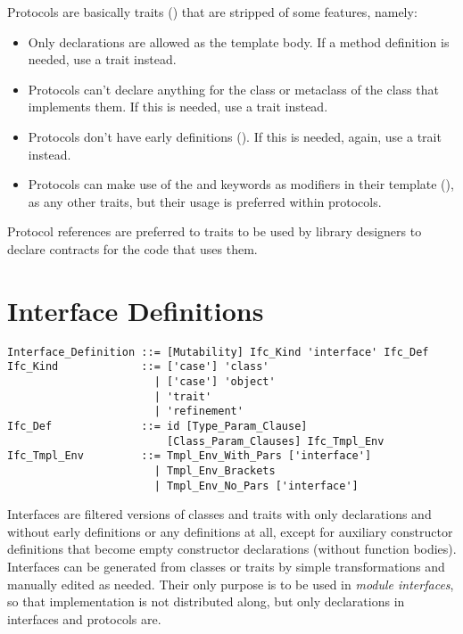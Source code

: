 Protocols are basically traits () that are stripped of some features, namely: 
\begin{itemize}
  \item Only declarations are allowed as the template body. If a method definition is needed, use a trait instead. 

  \item Protocols can't declare anything for the class or metaclass of the class that implements them. If this is needed, use a trait instead. 

  \item Protocols don't have early definitions (). If this is needed, again, use a trait instead. 

  \item Protocols can make use of the  and  keywords as modifiers in their template (), as any other traits, but their usage is preferred within protocols. 
\end{itemize}

Protocol references are preferred to traits to be used by library designers to declare contracts for the code that uses them. 





\section{Interface Definitions}
\label{sec:interfaces}

\syntax\begin{lstlisting}
Interface_Definition ::= [Mutability] Ifc_Kind 'interface' Ifc_Def
Ifc_Kind             ::= ['case'] 'class' 
                       | ['case'] 'object'
                       | 'trait'
                       | 'refinement'
Ifc_Def              ::= id [Type_Param_Clause]
                         [Class_Param_Clauses] Ifc_Tmpl_Env
Ifc_Tmpl_Env         ::= Tmpl_Env_With_Pars ['interface']
                       | Tmpl_Env_Brackets
                       | Tmpl_Env_No_Pars ['interface']
\end{lstlisting}

Interfaces are filtered versions of classes and traits with only declarations and without early definitions or any definitions at all, except for auxiliary constructor definitions that become empty constructor declarations (without function bodies). Interfaces can be generated from classes or traits by simple transformations and manually edited as needed. Their only purpose is to be used in {\em module interfaces}, so that implementation is not distributed along, but only declarations in interfaces and protocols are. 





